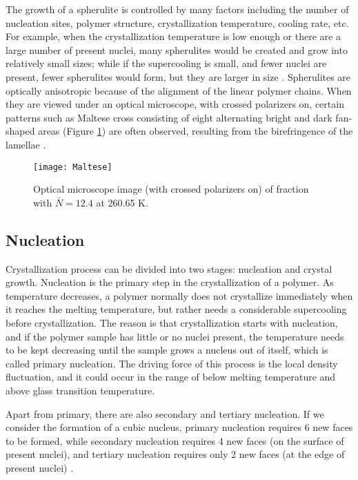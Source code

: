 The growth of a spherulite is controlled by many factors including the number of nucleation sites, polymer structure, crystallization temperature, cooling rate, etc. For example, when the crystallization temperature is low enough or there are a large number of present nuclei, many spherulites would be created and grow into relatively small sizes; while if the supercooling is small, and fewer nuclei are present, fewer spherulites would form, but they are larger in size \cite{LindaSawyerDavidT.Grubb2008}. Spherulites are optically anisotropic because of the alignment of the linear polymer chains. When they are viewed under an optical microscope, with crossed polarizers on, certain patterns such as Maltese cross consisting of eight alternating bright and dark fan-shaped areas (Figure \ref{fig:Maltese cross}) are often observed, resulting from the birefringence of the lamellae \cite{Bower2002}.

\begin{figure}[H]
\center
\vspace{1 cm}
\texttt{[image: Maltese]}
\caption{Optical microscope image (with crossed polarizers on) of fraction with $\bar{N} = 12.4$ at 260.65 K.}
\label{fig:Maltese cross}
\end{figure}

\subsection{Nucleation} \label{nucleation}

Crystallization process can be divided into two stages: nucleation and crystal growth. Nucleation is the primary step in the crystallization of a polymer. As temperature decreases, a polymer normally does not crystallize immediately when it reaches the melting temperature, but rather needs a considerable supercooling before crystallization. The reason is that crystallization starts with nucleation, and if the polymer sample has little or no nuclei present, the temperature needs to be kept decreasing until the sample grows a nucleus out of itself, which is called primary nucleation. The driving force of this process is the local density fluctuation, and it could occur in the range of below melting temperature and above glass transition temperature.

Apart from primary, there are also secondary and tertiary nucleation. If we consider the formation of a cubic nucleus, primary nucleation requires 6 new faces to be formed, while secondary nucleation requires 4 new faces (on the surface of present nuclei), and tertiary nucleation requires only 2 new faces (at the edge of present nuclei) \cite{Chai2016}.


